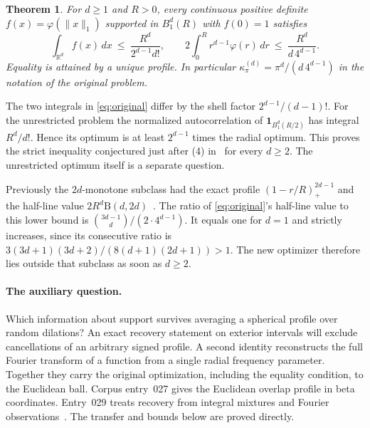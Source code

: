 \documentclass[11pt,a4paper]{article}
\newtheorem{theorem}{Theorem}[section]\newtheorem{lemma}[theorem]{Lemma}\newtheorem{proposition}[theorem]{Proposition}\newtheorem{corollary}[theorem]{Corollary}
\numberwithin{equation}{section}
\newcommand{\B}{\mathrm B}\newcommand{\supp}{\operatorname{supp}}\newcommand{\vol}{\operatorname{vol}}
\begin{document}
\begin{theorem}\label{thm:original}
For $d\ge1$ and $R>0$, every continuous positive definite $f(x)=\varphi(\|x\|_1)$ supported in $B_1^d(R)$ with $f(0)=1$ satisfies
\begin{equation}\label{eq:original}
 \int_{\mathbb R^d}f(x)\,dx\ \le\ \frac{R^d}{2^{d-1}d!},\qquad
 2\int_0^R r^{d-1}\varphi(r)\,dr\ \le\ \frac{R^d}{d\,4^{d-1}} .
\end{equation}
Equality is attained by a unique profile. In particular $\kappa_\pi^{(d)}=\pi^d/(d\,4^{d-1})$ in the notation of the original problem.
\end{theorem}
The two integrals in \eqref{eq:original} differ by the shell factor $2^{d-1}/(d-1)!$. For the unrestricted problem the normalized autocorrelation of $\mathbf1_{B_1^d(R/2)}$ has integral $R^d/d!$. Hence its optimum is at least $2^{d-1}$ times the radial optimum. This proves the strict inequality conjectured just after (4) in~\cite{BB16} for every $d\ge2$. The unrestricted optimum itself is a separate question.

Previously the $2d$-monotone subclass had the exact profile $(1-r/R)_+^{2d-1}$ and the half-line value $2R^d\B(d,2d)$~\cite[Theorem~1]{BB16}. The ratio of \eqref{eq:original}'s half-line value to this lower bound is $\binom{3d-1}{d}/(2\cdot4^{d-1})$. It equals one for $d=1$ and strictly increases, since its consecutive ratio is $3(3d+1)(3d+2)/(8(d+1)(2d+1))>1$. The new optimizer therefore lies outside that subclass as soon as $d\ge2$.

\paragraph{The auxiliary question.} Which information about support survives averaging a spherical profile over random dilations? An exact recovery statement on exterior intervals will exclude cancellations of an arbitrary signed profile. A second identity reconstructs the full Fourier transform of a function from a single radial frequency parameter. Together they carry the original optimization, including the equality condition, to the Euclidean ball. Corpus entry~027 gives the Euclidean overlap profile in beta coordinates. Entry~029 treats recovery from integral mixtures and Fourier observations~\cite{VMRC}. The transfer and bounds below are proved directly.
\end{document}
